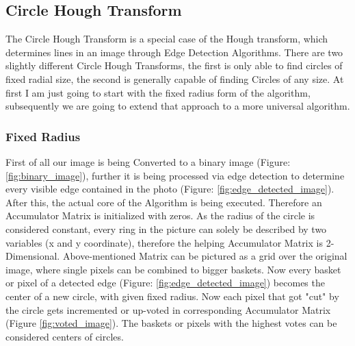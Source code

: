 \subsection{Circle Hough Transform}
The Circle Hough Transform is a special case of the Hough transform, which determines lines in an image through Edge Detection Algorithms. There are two slightly different Circle Hough Transforms, the first is only able to find circles of fixed radial size, the second is generally capable of finding Circles of any size. At first I am just going to start with the fixed radius form of the algorithm, subsequently we are going to extend that approach to a more universal algorithm.

\subsubsection{Fixed Radius}
First of all our image is being Converted to a binary image  (Figure: \ref{fig:binary_image}), further it is being processed via edge detection to determine every visible edge contained in the photo (Figure: \ref{fig:edge_detected_image}).
After this, the actual core of the Algorithm is being executed. Therefore an Accumulator Matrix is initialized with zeros. As the radius of the circle is considered constant, every ring in the picture can solely be described by two variables (x and y coordinate), therefore the helping Accumulator Matrix is 2-Dimensional.
Above-mentioned Matrix can be pictured as a grid over the original image, where single pixels can be combined to bigger baskets. Now every basket or pixel of a detected edge (Figure: \ref{fig:edge_detected_image}) becomes the center of a new circle, with given fixed radius. Now each pixel that got "cut" by the circle gets incremented or up-voted in corresponding Accumulator Matrix (Figure \ref{fig:voted_image}). The baskets or pixels with the highest votes can be considered centers of circles.
\newline


